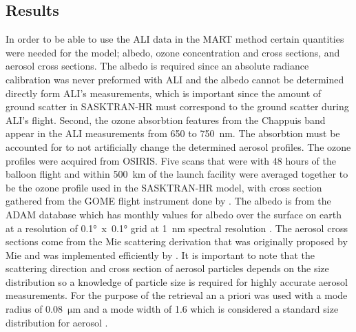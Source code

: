\documentclass[12pt]{article}
\begin{document}
\subsection{Results}

In order to be able to use the ALI data in the MART method certain quantities were needed for the model; albedo, ozone concentration and cross sections, and aerosol cross sections. The albedo is required since an absolute radiance calibration was never preformed with ALI and the albedo cannot be determined directly form ALI's measurements, which is important since the amount of ground scatter in SASKTRAN-HR must correspond to the ground scatter during ALI's flight. Second, the ozone absorbtion features from the Chappuis band appear in the ALI measurements from 650 to 750~nm. The absorbtion must be accounted for to not artificially change the determined aerosol profiles. The ozone profiles were acquired from OSIRIS. Five scans that were with 48 hours of the balloon flight and  within 500~km of the launch facility were averaged together to be the ozone profile used in the SASKTRAN-HR model, with cross section gathered from the GOME flight instrument done by \cite{Burrows1999}. The albedo is from the ADAM database which has monthly values for albedo over the surface on earth at a resolution of 0.1\si{\degree}~x~0.1\si{\degree} grid at 1~nm spectral resolution \citep{Muller2013}. The aerosol cross sections come from the Mie scattering derivation that was originally proposed by Mie and was implemented efficiently by \cite{Wiscombe1980}. It is important to note that the scattering direction and cross section of aerosol particles depends on the size distribution so a knowledge of particle size is required for highly accurate aerosol measurements. For the purpose of the retrieval an a priori was used with a mode radius of 0.08~$\si{\micro\metre}$  and a mode width of 1.6 which is considered a standard size distribution for aerosol \citep{Deshler2003}.
\end{document}

